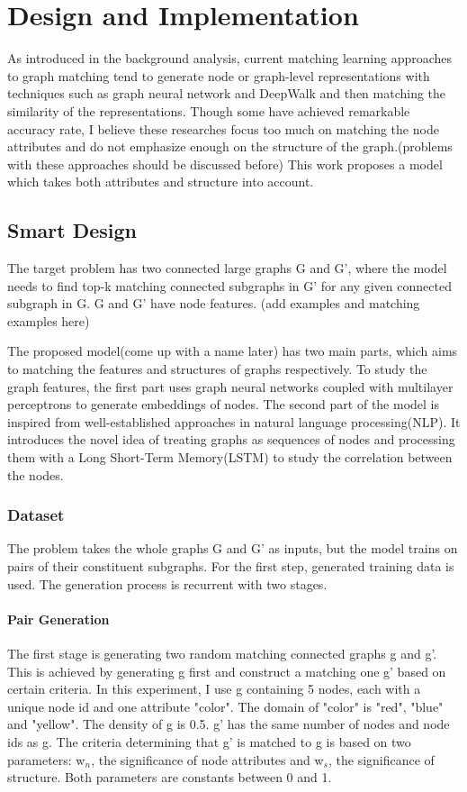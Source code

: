 \chapter{Design and Implementation}
As introduced in the background analysis, current matching learning approaches to graph matching tend to generate node or graph-level representations with techniques such as graph neural network and DeepWalk and then matching the similarity of the representations. Though some have achieved remarkable accuracy rate, I believe these researches focus too much on matching the node attributes and do not emphasize enough on the structure of the graph.(problems with these approaches should be discussed before) This work proposes a model which takes both attributes and structure into account.

\section{Smart Design}
\label{sec:des-hotpath}
The target problem has two connected large graphs G and G', where the model needs to find top-k matching connected subgraphs in G' for any given connected subgraph in G. G and G' have node features. (add examples and matching examples here)

The proposed model(come up with a name later) has two main parts, which aims to matching the features and structures of graphs respectively. To study the graph features, the first part uses graph neural networks coupled with multilayer perceptrons to generate embeddings of nodes. The second part of the model is inspired from well-established approaches in natural language processing(NLP). It introduces the novel idea of treating graphs as sequences of nodes and processing them with a Long Short-Term Memory(LSTM) to study the correlation between the nodes. 

\subsection{Dataset}
The problem takes the whole graphs G and G' as inputs, but the model trains on pairs of their constituent subgraphs. For the first step, generated training data is used. The generation process is recurrent with two stages.

\subsubsection{Pair Generation}
The first stage is generating two random matching connected graphs g and g'. This is achieved by generating g first and construct a matching one g' based on certain criteria. In this experiment, I use g containing 5 nodes, each with a unique node id and one attribute "color". The domain of "color" is "red", "blue" and "yellow". The density of g is 0.5. g' has the same number of nodes and node ids as g. The criteria determining that g' is matched to g is based on two parameters: w$_n$, the significance of node attributes and w$_s$, the significance of structure. Both parameters are constants between 0 and 1.

